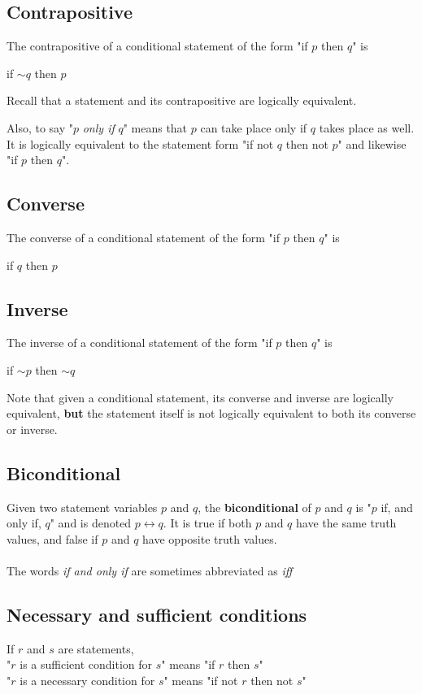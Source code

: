 \documentclass[a4paper]{article}
\begin{document}
\subsection{Contrapositive}
The contrapositive of a conditional statement of the form "if $p$ then $q$" is 
\begin{center}
	if $\sim q$ then $p$
\end{center}
Recall that a statement and its contrapositive are logically equivalent.

Also, to say "$p$ \textit{only if} $q$" means that $p$ can take place only if $q$ takes place as well. It is logically equivalent to the statement form "if not $q$ then not $p$" and likewise "if $p$ then $q$".
\subsection{Converse}
The converse of a conditional statement of the form "if $p$ then $q$" is
\begin{center}
	if $q$ then $p$
\end{center}
\subsection{Inverse}
The inverse of a conditional statement of the form "if $p$ then $q$" is
\begin{center}
	if $\sim p$ then $\sim q$
\end{center}
Note that given a conditional statement, its converse and inverse are logically equivalent, \textbf{but} the statement itself is not logically equivalent to both its converse or inverse.
\subsection{Biconditional}
Given two statement variables $p$ and $q$, the \textbf{biconditional} of $p$ and $q$ is "$p$ if, and only if, $q$" and is denoted $p \leftrightarrow q$. It is true if both $p$ and $q$ have the same truth values, and false if $p$ and $q$ have opposite truth values.\\
\\The words \textit{if and only if} are sometimes abbreviated as \textit{iff}
\subsection{Necessary and sufficient conditions}
If $r$ and $s$ are statements,\\
"$r$ is a sufficient condition for $s$" means "if $r$ then $s$"\\
"$r$ is a necessary condition for $s$" means "if not $r$ then not $s$"
\end{document}
